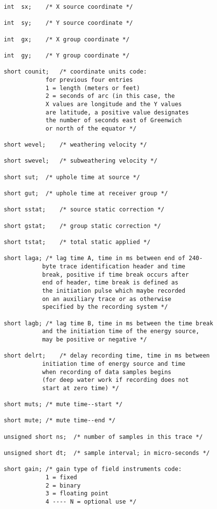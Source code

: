 {\begin{verbatim}
	int  sx;	/* X source coordinate */

	int  sy;	/* Y source coordinate */

	int  gx;	/* X group coordinate */

	int  gy;	/* Y group coordinate */

	short counit;	/* coordinate units code:
				for previous four entries
				1 = length (meters or feet)
				2 = seconds of arc (in this case, the
				X values are longitude and the Y values
				are latitude, a positive value designates
				the number of seconds east of Greenwich
				or north of the equator */

	short wevel;	/* weathering velocity */

	short swevel;	/* subweathering velocity */

	short sut;	/* uphole time at source */

	short gut;	/* uphole time at receiver group */

	short sstat;	/* source static correction */

	short gstat;	/* group static correction */

	short tstat;	/* total static applied */

	short laga;	/* lag time A, time in ms between end of 240-
			   byte trace identification header and time
			   break, positive if time break occurs after
			   end of header, time break is defined as
			   the initiation pulse which maybe recorded
			   on an auxiliary trace or as otherwise
			   specified by the recording system */

	short lagb;	/* lag time B, time in ms between the time break
			   and the initiation time of the energy source,
			   may be positive or negative */

	short delrt;	/* delay recording time, time in ms between
			   initiation time of energy source and time
			   when recording of data samples begins
			   (for deep water work if recording does not
			   start at zero time) */

	short muts;	/* mute time--start */

	short mute;	/* mute time--end */

	unsigned short ns;	/* number of samples in this trace */

	unsigned short dt;	/* sample interval; in micro-seconds */

	short gain;	/* gain type of field instruments code:
				1 = fixed
				2 = binary
				3 = floating point
				4 ---- N = optional use */


\end{verbatim}}
